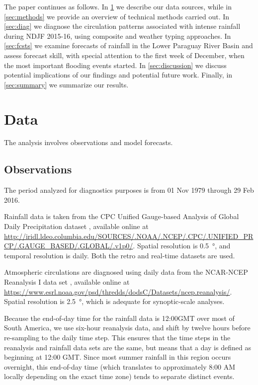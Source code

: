 \documentclass[twocol]{ametsoc}
\begin{document}
The paper continues as follows.
In \cref{sec:data} we describe our data sources, while in \cref{sec:methods} we provide an overview of technical methods carried out.
In \cref{sec:diag} we diagnose the circulation patterns associated with intense rainfall during NDJF 2015-16, using composite and weather typing approaches.
In \cref{sec:fcsts} we examine forecasts of rainfall in the Lower Paraguay River Basin and assess forecast skill, with special attention to the first week of December, when the most important flooding events started.
In \cref{sec:discussion} we discuss potential implications of our findings and potential future work.
Finally, in \cref{sec:summary} we summarize our results.


\section{Data} \label{sec:data}

The analysis involves observations and model forecasts.

\subsection{Observations}

The period analyzed for diagnostics purposes is from 01 Nov 1979 through 29 Feb 2016.

Rainfall data is taken from the CPC Unified Gauge-based Analysis of Global Daily Precipitation dataset \citep{xie2010cpc}, available online at \url{http://iridl.ldeo.columbia.edu/SOURCES/.NOAA/.NCEP/.CPC/.UNIFIED_PRCP/.GAUGE_BASED/.GLOBAL/.v1p0/}.
Spatial resolution is \SI{0.5}{\degree}, and temporal resolution is daily.
Both the retro and real-time datasets are used.

Atmospheric circulations are diagnosed using daily data from the NCAR-NCEP Reanalysis I data set \citep{Kalnay1996}, available online at \url{https://www.esrl.noaa.gov/psd/thredds/dodsC/Datasets/ncep.reanalysis/}.
Spatial resolution is \SI{2.5}{\degree}, which is adequate for synoptic-scale analyses.

Because the end-of-day time for the rainfall data is 12:00GMT over most of South America, we use six-hour reanalysis data, and shift by twelve hours before re-sampling to the daily time step.
This ensures that the time steps in the reanalysis and rainfall data sets are the same, but means that a day is defined as beginning at 12:00 GMT.
Since most summer rainfall in this region occurs overnight, this end-of-day time (which translates to approximately 8:00 AM locally depending on the exact time zone) tends to separate distinct events.
\end{document}
